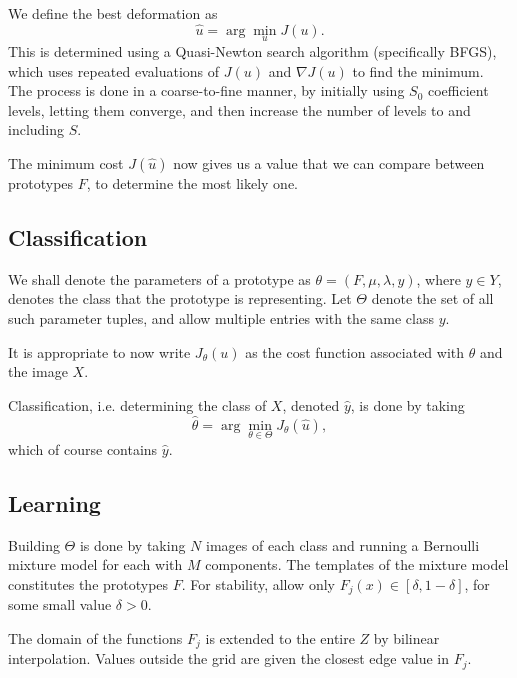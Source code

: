\documentclass{report}
\begin{document}
We define the best deformation as
\[
    \hat u = \arg\min_u J(u).
\]
This is determined using a Quasi-Newton search algorithm (specifically BFGS), which uses repeated evaluations of $J(u)$ and $\nabla J(u)$ to find the minimum. The process is done in a coarse-to-fine manner, by initially using $S_0$ coefficient levels, letting them converge, and then increase the number of levels to and including $S$.

The minimum cost $J(\hat u)$ now gives us a value that we can compare between prototypes $F$, to determine the most likely one. 


\subsection{Classification}

We shall denote the parameters of a prototype as $\theta = (F, \mu, \lambda, y)$, where $y \in Y$, denotes the class that the prototype is representing. Let $\Theta$ denote the set of all such parameter tuples, and allow multiple entries with the same class $y$.

It is appropriate to now write $J_{\theta}(u)$ as the cost function associated with $\theta$ and the image $X$.

Classification, i.e. determining the class of $X$, denoted $\hat y$, is done by taking
\[
    \hat \theta = \arg\min_{\theta \in \Theta} J_{\theta}(\hat u),
\]
which of course contains $\hat y$.



\subsection{Learning}

Building $\Theta$ is done by taking $N$ images of each class and running a Bernoulli mixture model for each with $M$ components. The templates of the mixture model constitutes the prototypes $F$. For stability, allow only $F_j(x) \in [\delta, 1-\delta]$, for some small value $\delta > 0$. 

The domain of the functions $F_j$ is extended to the entire $Z$ by bilinear interpolation. Values outside the grid are given the closest edge value in $F_j$.
\end{document}
